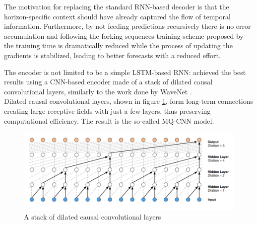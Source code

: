 \documentclass[a4paper]{article} %
\begin{document}
	The motivation for replacing the standard RNN-based decoder is that the horizon-specific context should have already captured the flow of temporal information. Furthermore, by not feeding predictions recursively there is no error accumulation and following the forking-sequences training scheme proposed by \cite{MQCNN} the training time is dramatically reduced while the process of updating the gradients is stabilized, leading to better forecasts with a reduced effort.
	
	The encoder is not limited to be a simple LSTM-based RNN: \cite{MQCNN} achieved the best results using a CNN-based encoder made of a stack of dilated causal convolutional layers, similarly to the work done by WaveNet \cite{Wavenet}.\\
	Dilated causal convolutional layers, shown in figure \ref{fig:dilated_cnn}, form long-term connections creating large receptive fields with just a few layers, thus preserving computational efficiency. The result is the so-called MQ-CNN model.
	\begin{figure}
		\includegraphics[width=\linewidth]{img/wavenet.png}
		\caption{A stack of dilated causal convolutional layers}
		\label{fig:dilated_cnn}
	\end{figure}
	
	
\end{document}

